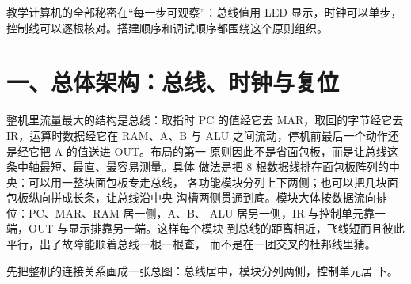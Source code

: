 \begin{keyidea}
教学计算机的全部秘密在“每一步可观察”：总线值用 LED 显示，时钟可以单步，控制线可以逐根核对。搭建顺序和调试顺序都围绕这个原则组织。
\end{keyidea}

\section{一、总体架构：总线、时钟与复位}

整机里流量最大的结构是总线：取指时
PC 的值经它去 MAR，取回的字节经它去 IR，运算时数据经它在 RAM、A、B 与
ALU 之间流动，停机前最后一个动作还是经它把 A 的值送进 OUT。布局的第一
原则因此不是省面包板，而是让总线这条中轴最短、最直、最容易测量。具体
做法是把 8 根数据线排在面包板阵列的中央：可以用一整块面包板专走总线，
各功能模块分列上下两侧；也可以把几块面包板纵向拼成长条，让总线沿中央
沟槽两侧贯通到底。模块大体按数据流向排位：PC、MAR、RAM 居一侧，A、B、
ALU 居另一侧，IR 与控制单元靠一端，OUT 与显示排靠另一端。这样每个模块
到总线的距离相近，飞线短而且彼此平行，出了故障能顺着总线一根一根查，
而不是在一团交叉的杜邦线里猜。

先把整机的连接关系画成一张总图：总线居中，模块分列两侧，控制单元居
下。

